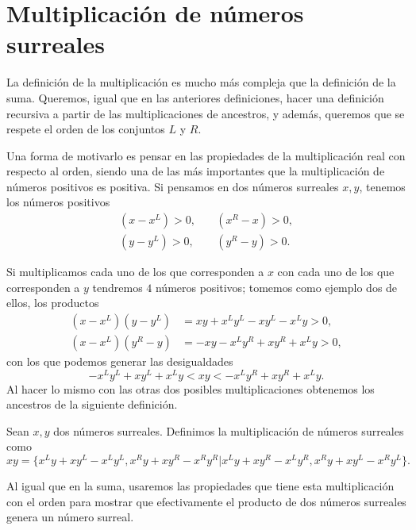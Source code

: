 \section {Multiplicación de números surreales}
    
    La definici\'on de la multiplicaci\'on es mucho m\'as compleja que la definici\'on de la suma. Queremos, igual que en las anteriores definiciones, hacer una definici\'on recursiva a partir de las multiplicaciones de ancestros, y adem\'as, queremos que se respete el orden de los conjuntos $L$ y $R$.

    Una forma de motivarlo es pensar en las propiedades de la multiplicaci\'on real con respecto al orden, siendo una de las m\'as importantes que la multiplicaci\'on de n\'umeros positivos es positiva. Si pensamos en dos n\'umeros surreales $x,y$, tenemos los n\'umeros positivos
    \begin{align*}
        (x-x^L) > 0, \quad & (x^R-x)>0, \\
        (y-y^L) > 0, \quad & (y^R-y)>0.
    \end{align*}

    Si multiplicamos cada uno de los que corresponden a $x$ con cada uno de los que corresponden a $y$ tendremos $4$ n\'umeros positivos; tomemos como ejemplo dos de ellos, los productos
    \begin{align*}
        (x-x^L)(y-y^L) &= xy + x^Ly^L - xy^L - x^Ly > 0,\\
        (x-x^L)(y^R-y) &= -xy -x^Ly^R + xy^R + x^Ly > 0,
    \end{align*}
    con los que podemos generar las desigualdades
    \[
        - x^Ly^L + xy^L + x^Ly < xy < -x^Ly^R + xy^R + x^Ly.
    \]
    Al hacer lo mismo con las otras dos posibles multiplicaciones obtenemos los ancestros de la siguiente definici\'on.

    \begin{definition}[Multiplicaci\'on]
        Sean $x, y$ dos n\'umeros surreales. Definimos la multiplicaci\'on de n\'umeros surreales como
        \[
            xy = \big\{x^Ly+xy^L-x^Ly^L, x^Ry+xy^R-x^Ry^R\big|x^Ly+xy^R-x^Ly^R, x^Ry+xy^L-x^Ry^L\big\}.
        \]
    \end{definition}

    Al igual que en la suma, usaremos las propiedades que tiene esta multiplicaci\'on con el orden para mostrar que efectivamente el producto de dos n\'umeros surreales genera un n\'umero surreal.

